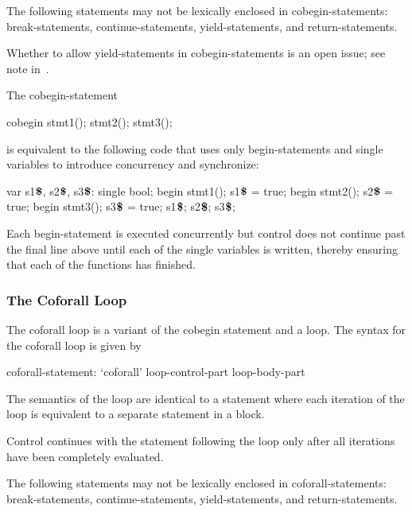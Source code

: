 The following statements may not be lexically enclosed in
cobegin-statements: break-statements, continue-statements,
yield-statements, and return-statements.

\begin{openissue}
Whether to allow yield-statements in cobegin-statements is an open
issue; see note in~.
\end{openissue}

\begin{example}
The cobegin-statement
\begin{chapel}
cobegin {
  stmt1();
  stmt2();
  stmt3();
}
\end{chapel}
is equivalent to the following code that uses only begin-statements
and single variables to introduce concurrency and synchronize:
\begin{chapel}
var s1$\mbox{{\bf \$}}$, s2$\mbox{{\bf \$}}$, s3$\mbox{{\bf \$}}$: single bool;
begin { stmt1(); s1$\mbox{{\bf \$}}$ = true; }
begin { stmt2(); s2$\mbox{{\bf \$}}$ = true; }
begin { stmt3(); s3$\mbox{{\bf \$}}$ = true; }
s1$\mbox{{\bf \$}}$; s2$\mbox{{\bf \$}}$; s3$\mbox{{\bf \$}}$;
\end{chapel}
Each begin-statement is executed concurrently but control does not
continue past the final line above until each of the single variables
is written, thereby ensuring that each of the functions has finished.
\end{example}

\subsubsection{The Coforall Loop}
\label{Coforall}

The coforall loop is a variant of the cobegin statement and a loop.
The syntax for the coforall loop is given by
\begin{syntax}
coforall-statement:
  `coforall' loop-control-part loop-body-part
\end{syntax}

The semantics of the  loop are identical to
a  statement where each iteration of the 
loop is equivalent to a separate statement in a  block.

Control continues with the statement following the 
loop only after all iterations have been completely evaluated.

The following statements may not be lexically enclosed in
coforall-statements: break-statements, continue-statements,
yield-statements, and return-statements.

